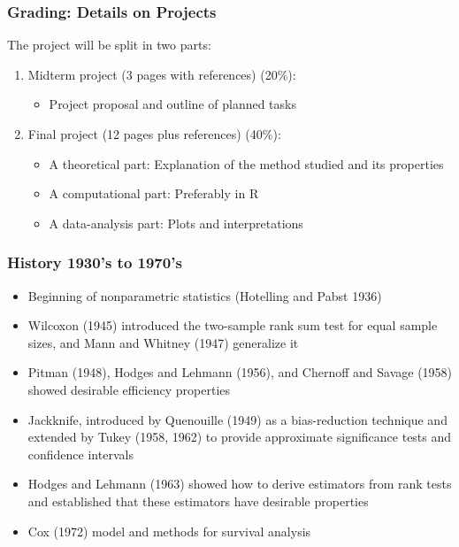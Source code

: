 \documentclass[10pt]{beamer}
\begin{document}
\begin{frame}
\frametitle{Grading: Details on Projects}

The project will be split in two parts:
\begin{enumerate}
\item Midterm project (3 pages with references) (20\%): 
\begin{itemize}
\item Project proposal and outline of planned tasks
\end{itemize}
\item Final project (12 pages plus references) (40\%): 
\begin{itemize}
\item A theoretical part: Explanation of the method studied and its properties
\item A computational part: Preferably in R
\item A data-analysis part: Plots and interpretations
\end{itemize}
\end{enumerate}

\end{frame}

\begin{frame}
\frametitle{History 1930's to 1970's}

\begin{itemize}
\item Beginning of nonparametric statistics (Hotelling and Pabst 1936)
\item Wilcoxon (1945) introduced the two-sample rank sum test for equal sample sizes, and Mann and Whitney (1947) generalize it
\item Pitman (1948), Hodges and Lehmann (1956), and Chernoff and Savage (1958) showed desirable efficiency properties
\item Jackknife, introduced by Quenouille (1949) as a bias-reduction technique and extended by Tukey (1958, 1962) to provide approximate significance tests and confidence intervals
\item Hodges and Lehmann (1963) showed how to derive estimators from rank tests and established that these estimators have desirable properties
\item Cox (1972) model and methods for survival analysis
\end{itemize}

\end{frame}
\end{document}
